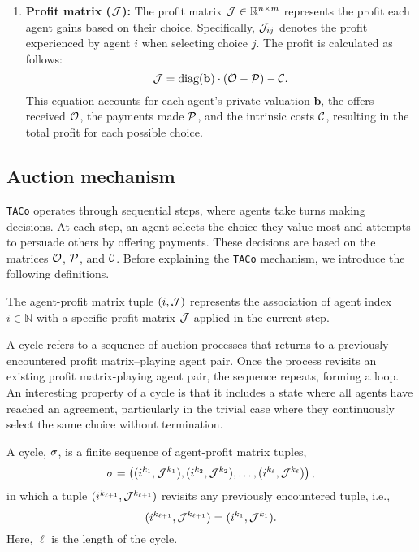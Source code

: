 \begin{enumerate}[\hspace{0pt}1)]
    \item \textbf{Profit matrix ($\mathcal{J}$):} The profit matrix $\mathcal{J} \in \mathbb{R}^{n \times m}$ represents the profit each agent gains based on their choice. Specifically, $\mathcal{J}_{ij}$ denotes the profit experienced by agent $i$ when selecting choice $j$. The profit is calculated as follows:
    \begin{equation}
        \mathcal{J} = \text{diag}(\mathbf{b}) \cdot (\mathcal{O} - \mathcal{P}) - \mathcal{C}.
    \end{equation}
    This equation accounts for each agent's private valuation $\textbf{b}$, the offers received $\mathcal{O}$, the payments made $\mathcal{P}$, and the intrinsic costs $\mathcal{C}$, resulting in the total profit for each possible choice.
\end{enumerate}

\subsection{Auction mechanism} \label{sec:AuctionMechanism}

\texttt{TACo} operates through sequential steps, where agents take turns making decisions. At each step, an agent selects the choice they value most and attempts to persuade others by offering payments. These decisions are based on the matrices $\mathcal{O}$, $\mathcal{P}$, and $\mathcal{C}$. Before explaining the \texttt{TACo} mechanism, we introduce the following definitions.

\begin{definition}  
The agent-profit matrix tuple $(i, \mathcal{J})$ represents the association of agent index $i \in \mathbb{N}$ with a specific profit matrix $\mathcal{J}$ applied in the current step.
\end{definition}

A cycle refers to a sequence of auction processes that returns to a previously encountered profit matrix–playing agent pair. Once the process revisits an existing profit matrix-playing agent pair, the sequence repeats, forming a loop. An interesting property of a cycle is that it includes a state where all agents have reached an agreement, particularly in the trivial case
where they continuously select the same choice without termination. 

\begin{definition}\label{def:cycle}  
A cycle, $\sigma$, is a finite sequence of agent-profit matrix tuples,  
\[
\sigma=\left((i^{k_1},\mathcal{J}^{k_1}), (i^{k_2},\mathcal{J}^{k_2}), \ldots, (i^{k_\ell},\mathcal{J}^{k_\ell})\right),
\]
in which a tuple $(i^{k_{\ell+1}}, \mathcal{J}^{k_{\ell+1}})$ revisits any previously encountered tuple, i.e., 
\[
(i^{k_{\ell+1}}, \mathcal{J}^{k_{\ell+1}}) = (i^{k_1}, \mathcal{J}^{k_1}).
\]
Here, $\ell$ is the length of the cycle.  
\end{definition}

